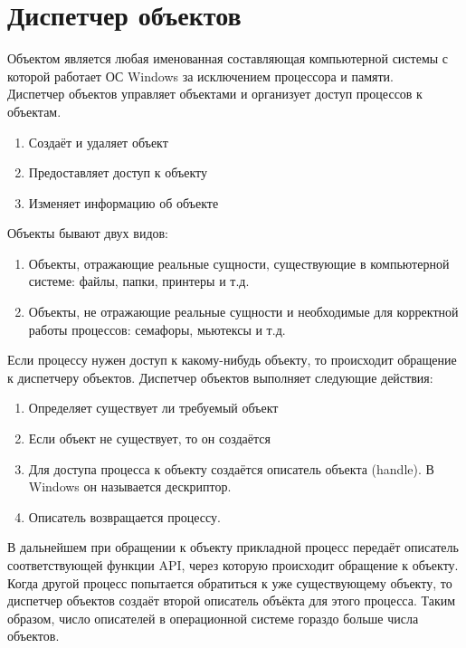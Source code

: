 \documentclass[a4paper]{article}
\begin{document}
\section{Диспетчер объектов}
\setcounter{subsection}{0}
Объектом является любая именованная составляющая компьютерной системы с которой работает ОС Windows за исключением процессора и памяти.\\
Диспетчер объектов управляет объектами и организует доступ процессов к объектам.
\begin{enumerate}
        \item Создаёт и удаляет объект
	\item Предоставляет доступ к объекту
	\item Изменяет информацию об объекте
\end{enumerate}
Объекты бывают двух видов:
\begin{enumerate}
        \item Объекты, отражающие реальные сущности, существующие в компьютерной системе: файлы, папки, принтеры и т.д.
	\item Объекты, не отражающие реальные сущности и необходимые для корректной работы процессов: семафоры, мьютексы и т.д.
\end{enumerate}
Если процессу нужен доступ к какому-нибудь объекту, то происходит обращение к диспетчеру объектов. Диспетчер объектов выполняет следующие действия:
\begin{enumerate}
        \item  Определяет существует ли требуемый объект
	\item Если объект не существует, то он создаётся
	\item  Для доступа процесса к объекту создаётся описатель объекта (handle). В Windows он называется дескриптор.
	\item Описатель возвращается процессу. 
\end{enumerate}
В дальнейшем при обращении к объекту прикладной процесс передаёт описатель соответствующей функции API, через которую происходит обращение к объекту.\\
Когда другой процесс попытается обратиться к уже существующему объекту, то диспетчер объектов создаёт второй описатель объёкта для этого процесса. Таким образом, число описателей в операционной системе гораздо больше числа объектов.
\end{document}
